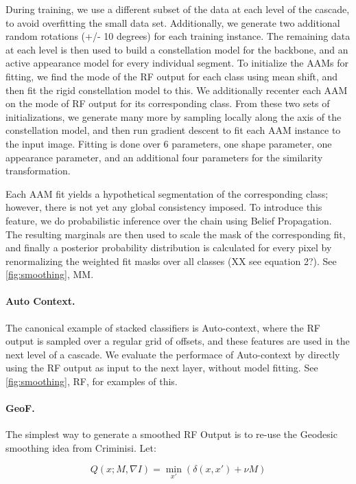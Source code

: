 \documentclass[10pt,twocolumn,letterpaper]{article}
\begin{document}
During training, we use a different subset of the data at each level of the cascade, to avoid overfitting the small data set.  Additionally, we generate two additional random rotations (+/- 10 degrees) for each training instance.  The remaining data at each level is then used to build a constellation model for the backbone, and an active appearance model for every individual segment.  To initialize the AAMs for fitting, we find the mode of the RF output for each class using mean shift, and then fit the rigid constellation model to this.  We additionally recenter each AAM on the mode of RF output for its corresponding class.  From these two sets of initializations, we generate many more by sampling locally along the axis of the constellation model, and then run gradient descent to fit each AAM instance to the input image.  Fitting is done over 6 parameters, one shape parameter, one appearance parameter, and an additional four parameters for the similarity transformation.

Each AAM fit yields a hypothetical segmentation of the corresponding class; however, there is not yet any global consistency imposed.  To introduce this feature, we do probabilistic inference over the chain using Belief Propagation.  The resulting marginals are then used to scale the mask of the corresponding fit, and finally a posterior probability distribution is calculated for every pixel by renormalizing the weighted fit masks over all classes (XX see equation 2?).  See \ref{fig:smoothing}, MM.


\paragraph{Auto Context. }

The canonical example of stacked classifiers is Auto-context, where the RF output is sampled over a regular grid of offsets, and these features are used in the next level of a cascade.  We evaluate the performace of Auto-context by directly using the RF output as input to the next layer, without model fitting.  See \ref{fig:smoothing}, RF, for examples of this.

\paragraph{GeoF. }
The simplest way to generate a smoothed RF Output is to re-use the Geodesic smoothing idea from Criminisi.  Let:

\[ Q(x; M, \nabla I) = \min_{x'} (\delta (x,x') + \nu M) \]
\end{document}
